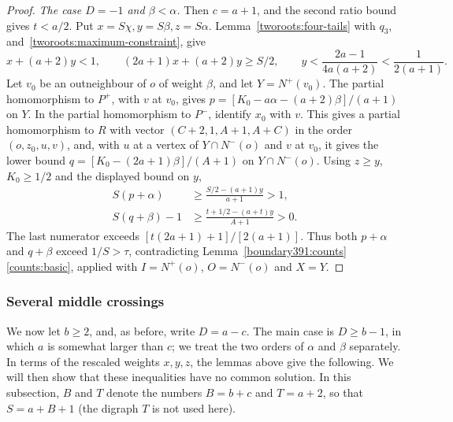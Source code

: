 \begin{proof}
\emph{The case $D=-1$ and $\beta<\alpha$.}
Then $c=a+1$, and the second ratio bound gives
$t<a/2$. Put $x=S\chi,y=S\beta,z=S\alpha$.
Lemma~\ref{tworoots:four-tails} with $q_3$, and~\eqref{tworoots:maximum-constraint}, give
\[
 x+(a+2)y<1,\qquad (2a+1)x+(a+2)y\ge S/2,
 \qquad y<\frac{2a-1}{4a(a+2)}<\frac1{2(a+1)}.
\]
Let $v_0$ be an outneighbour of $o$ of weight $\beta$, and let $Y=N^+(v_0)$.
The partial homomorphism to $P^+$, with $v$ at $v_0$, gives $p=[K_0-a\alpha-(a+2)\beta]/(a+1)$
on $Y$. In the partial homomorphism to $P^-$, identify $x_0$ with $v$. This gives a partial homomorphism to $R$ with vector $(C+2,1,A+1,A+C)$ in the order $(o,z_0,u,v)$, and, with $u$ at a vertex of $Y\cap N^-(o)$ and $v$ at $v_0$, it gives the lower bound $q=[K_0-(2a+1)\beta]/(A+1)$ on $Y\cap N^-(o)$.
Using $z\ge y$, $K_0\ge1/2$ and the displayed bound on $y$,
\[
\begin{split}
 S(p+\alpha)&\ge\frac{S/2-(a+1)y}{a+1}>1,\\
 S(q+\beta)-1&\ge
 \frac{t+1/2-(a+t)y}{A+1}>0.
\end{split}
\]
The last numerator exceeds $[t(2a+1)+1]/[2(a+1)]$. Thus both $p+\alpha$ and $q+\beta$ exceed
$1/S>\tau$, contradicting Lemma~\ref{boundary391:counts}\ref{counts:basic}, applied with $I=N^+(o)$, $O=N^-(o)$ and $X=Y$.
\end{proof}


\subsubsection{Several middle crossings}
We now let $b\ge2$, and, as before, write $D=a-c$. The main case is $D\ge b-1$, in which $a$ is somewhat larger than $c$; we treat the two orders of $\alpha$ and $\beta$ separately. In terms of the rescaled weights $x,y,z$, the lemmas above give the following. We will then show that these inequalities have no common solution.
In this subsection, $B$ and $T$ denote the numbers $B=b+c$ and $T=a+2$, so that $S=a+B+1$ (the digraph $T$ is not used here).


